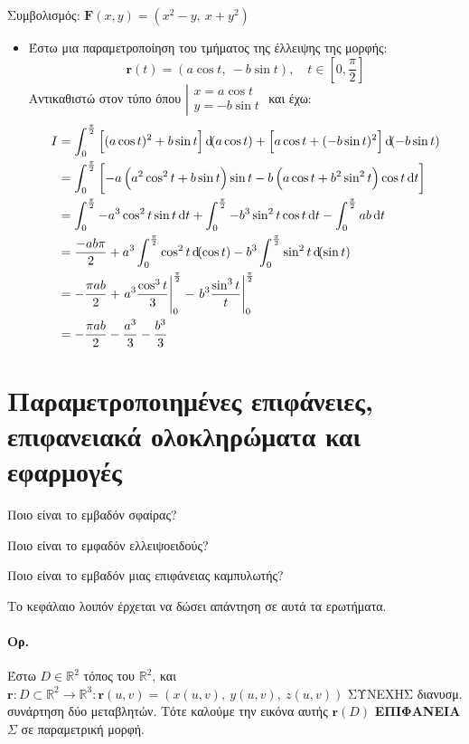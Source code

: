 \documentclass[11pt,a4paper,titlepage]{article}
\begin{document}
\begin{attnbox}{}
Συμβολισμός: \( \mathbf F(x,y) = \left(x^2-y,\ x+y^2\right) \)
\end{attnbox}

\begin{itemize}
\item Έστω μια παραμετροποίηση του τμήματος της έλλειψης της μορφής:
\[
\mathbf r(t) = \left(
a\cos t,\ -b\sin t
\right), \quad t \in \left[0,\frac{\pi}{2}\right]
\]
Αντικαθιστώ στον τύπο όπου \( \left|\begin{array}{l}
x = a\cos t \\ y = -b\sin t
\end{array}\right. \) και έχω:
\begin{align*}
I &= \int_0^\frac{\pi}{2}
\left[
(a\cos t)^2+b\sin t
\right] \dif (a\cos t) + \left[
a\cos t + (-b\sin t)^2
\right] \dif (-b\sin t)
\\ &= \int_0^\frac{\pi}{2} \left[
-a\left(
a^2\cos^2t+b\sin t
\right) \sin t -b \left(
a\cos t + b^2\sin^2 t
\right) \cos t \dif t
\right]
\\ &= \int_0^\frac{\pi}{2} -a^3\cos^2t\sin t\dif t + \int_0^\frac{\pi}{2} -b^3\sin^2t\cos t\dif t - \int_0^\frac{\pi}{2} ab\dif t
\\ &= \frac{-ab\pi}{2} + a^3\int_0^\frac{\pi}{2} \cos^2t\dif(\cos t) - b^3\int_0^\frac{\pi}{2} \sin^2t\dif(\sin t)
\\ &= -\frac{\pi ab}{2}+\left. a^3\frac{\cos^3t}{3} \right|_0^\frac{\pi}{2} -\left. b^3\frac{\sin^3t}{t} \right|_0^\frac{\pi}{2}
\\ &= -\frac{\pi ab}{2} - \frac{a^3}{3} - \frac{b^3}{3}
\end{align*}
\end{itemize}

\section{Παραμετροποιημένες επιφάνειες, επιφανειακά ολοκληρώματα και εφαρμογές}
Ποιο είναι το εμβαδόν σφαίρας?

Ποιο είναι το εμφαδόν ελλειψοειδούς?

Ποιο είναι το εμβαδόν μιας επιφάνειας καμπυλωτής?

Το κεφάλαιο λοιπόν έρχεται να δώσει απάντηση σε αυτά τα ερωτήματα.

\paragraph{Ορ.}
Έστω \( D \in \mathbb R ^2 \) τόπος του \( \mathbb R ^2 \), και \( \mathbf r: D \subset \mathbb R ^2 \to \mathbb R ^3 : \mathbf r(u,v)=\left(
x(u,v),\ y(u,v),\ z(u,v)
\right) \) ΣΥΝΕΧΗΣ διανυσμ. συνάρτηση δύο μεταβλητών. Τότε καλούμε την εικόνα αυτής \( \mathbf r(D) \) \textbf{ΕΠΙΦΑΝΕΙΑ} \( \varSigma \) σε παραμετρική μορφή.
\end{document}
